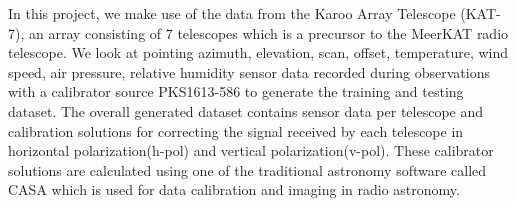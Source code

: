 In this project, we make use of the data from the Karoo Array Telescope (KAT-7), an array consisting of $7$ telescopes which is a precursor to the MeerKAT radio telescope. We look at pointing azimuth, elevation, scan, offset, temperature, wind speed, air pressure, relative humidity sensor data recorded during  observations with a calibrator source PKS1613-586 to generate the training and testing dataset. The overall generated dataset contains sensor data per telescope and calibration solutions for correcting the signal received by each telescope in horizontal polarization(h-pol)  and vertical polarization(v-pol). These calibrator solutions are calculated using one of the traditional astronomy software called CASA which is used for data calibration and imaging in radio astronomy.

